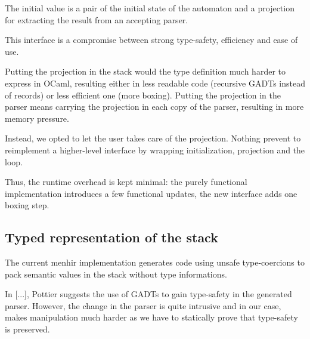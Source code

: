\documentclass[twoside,a4paper]{article}
\begin{document}
The initial value is a pair of the initial state of the automaton and a
projection for extracting the result from an accepting parser.

This interface is a compromise between strong type-safety, efficiency and ease
of use.

Putting the projection in the stack would the type definition much harder to
express in OCaml, resulting either in less readable code (recursive GADTs
instead of records) or less efficient one (more boxing). Putting the projection
in the parser means carrying the projection in each copy of the parser,
resulting in more memory pressure.

Instead, we opted to let the user takes care of the projection. Nothing prevent
to reimplement a higher-level interface by wrapping initialization, projection
and the loop.

Thus, the runtime overhead is kept minimal: the purely functional
implementation introduces a few functional updates, the new interface adds one
boxing step.



\subsection{Typed representation of the stack}


The current menhir implementation generates code using unsafe type-coercions to
pack semantic values in the stack without type informations.

In [...], Pottier suggests the use of GADTs to gain type-safety in the
generated parser. However, the change in the parser is quite intrusive and in
our case, makes manipulation much harder as we have to statically prove that
type-safety is preserved.
\end{document}
